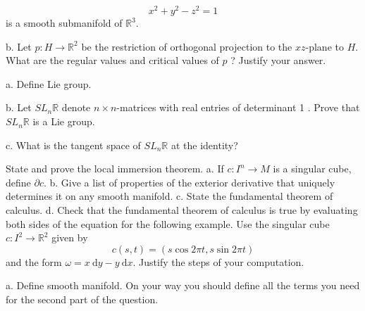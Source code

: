 \documentclass[10pt]{article}
\begin{document}
$$
x^{2}+y^{2}-z^{2}=1
$$
is a smooth submanifold of $\mathbb{R}^{3}$.

b. Let $p: H \rightarrow \mathbb{R}^{2}$ be the restriction of orthogonal projection to the $x z$-plane to $H$. What are the regular values and critical values of $p$ ? Justify your answer.

\newpage
a. Define Lie group.

b. Let $S L_{n} \mathbb{R}$ denote $n \times n$-matrices with real entries of determinant 1 . Prove that $S L_{n} \mathbb{R}$ is a Lie group.

c. What is the tangent space of $S L_{n} \mathbb{R}$ at the identity?

\newpage
State and prove the local immersion theorem.
\newpage
a. If $c: I^{n} \rightarrow M$ is a singular cube, define $\partial c$.
b. Give a list of properties of the exterior derivative that uniquely determines it on any smooth manifold.
c. State the fundamental theorem of calculus.
d. Check that the fundamental theorem of calculus is true by evaluating both sides of the equation for the following example. Use the singular cube $c: I^{2} \rightarrow \mathbb{R}^{2}$ given by
$$
c(s, t)=(s \cos 2 \pi t, s \sin 2 \pi t)
$$
and the form $\omega=x \mathrm{~d} y-y \mathrm{~d} x$. Justify the steps of your computation.

\newpage
a. Define smooth manifold. On your way you should define all the terms you need for the second part of the question.
\end{document}
